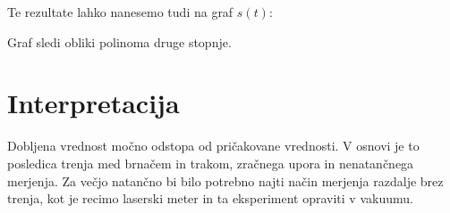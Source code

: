 \documentclass[a4paper]{article}
\begin{document}
Te rezultate lahko nanesemo tudi na graf $s(t)$:
\datatable

\begin{center}
\end{center}

Graf sledi obliki polinoma druge stopnje. 

\section*{Interpretacija}
Dobljena vrednost močno odstopa od pričakovane vrednosti.
V osnovi je to posledica trenja med brnačem in trakom, zračnega upora in nenatančnega merjenja. Za večjo natančno bi bilo potrebno najti način merjenja razdalje brez trenja, kot je recimo laserski meter in ta eksperiment opraviti v vakuumu. 
\end{document}
